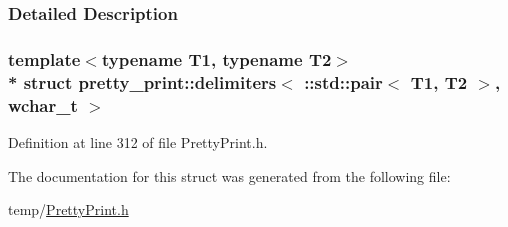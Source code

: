 \subsubsection{Detailed Description}
\subsubsection*{template$<$typename T1, typename T2$>$\\*
struct pretty\+\_\+print\+::delimiters$<$ \+::std\+::pair$<$ T1, T2 $>$, wchar\+\_\+t $>$}



Definition at line 312 of file Pretty\+Print.\+h.



The documentation for this struct was generated from the following file\+:\begin{DoxyCompactItemize}
\item 
temp/\hyperlink{PrettyPrint_8h}{Pretty\+Print.\+h}\end{DoxyCompactItemize}
